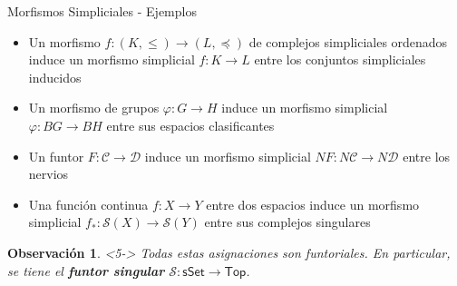 \documentclass[11pt]{beamer}
\newcommand{\cat}[1]{\mathsf{#1}}
\newtheorem{defs}{Definición}
\newtheorem{obs}{Observación}
\begin{document}
\begin{frame}{Morfismos Simpliciales - Ejemplos}
\begin{itemize}
\item <1-> Un morfismo $f \colon (K,\leq) \to (L,\preceq)$ de complejos simpliciales ordenados induce un morfismo simplicial $f : K \to L$ entre los conjuntos simpliciales inducidos %
\item <2-> Un morfismo de grupos $\varphi : G \to H$ induce un morfismo simplicial $\varphi : BG \to BH$ entre sus espacios clasificantes %
\item <3-> Un funtor $F : \mathscr{C} \to \mathscr{D}$ induce un morfismo simplicial $NF : N\mathscr{C} \to N\mathscr{D}$ entre los nervios
\item <4-> Una función continua $f : X \to Y$ entre dos espacios induce un morfismo simplicial $f_* : \mathscr{S}(X) \to \mathscr{S}(Y)$ entre sus complejos singulares
\end{itemize}
\begin{obs} <5-> Todas estas asignaciones son funtoriales. En particular, se tiene el \textbf{funtor singular} $\mathscr{S} : \cat{sSet} \to \cat{Top}$.
\end{obs}
\end{frame}

%
%
\end{document}
